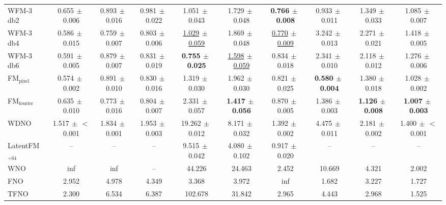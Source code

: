 \begin{table}[ht]
{\begin{tabular}{l ccc ccc ccc}
WFM-3 db2 & 0.655{\scriptsize$\,\pm\,$0.006} & 0.893{\scriptsize$\,\pm\,$0.016} & 0.981{\scriptsize$\,\pm\,$0.022} & 1.051{\scriptsize$\,\pm\,$0.043} & 1.729{\scriptsize$\,\pm\,$0.048} & \textbf{0.766{\scriptsize$\,\pm\,$0.008}} & 0.933{\scriptsize$\,\pm\,$0.011} & 1.349{\scriptsize$\,\pm\,$0.033} & 1.085{\scriptsize$\,\pm\,$0.007} \\
WFM-3 db4 & 0.586{\scriptsize$\,\pm\,$0.015} & 0.759{\scriptsize$\,\pm\,$0.007} & 0.803{\scriptsize$\,\pm\,$0.006} & \underline{1.029{\scriptsize$\,\pm\,$0.059}} & 1.869{\scriptsize$\,\pm\,$0.048} & \underline{0.770{\scriptsize$\,\pm\,$0.009}} & 3.242{\scriptsize$\,\pm\,$0.013} & 2.271{\scriptsize$\,\pm\,$0.021} & 1.418{\scriptsize$\,\pm\,$0.005} \\
WFM-3 db6 & 0.591{\scriptsize$\,\pm\,$0.005} & 0.879{\scriptsize$\,\pm\,$0.007} & 0.831{\scriptsize$\,\pm\,$0.019} & \textbf{0.755{\scriptsize$\,\pm\,$0.025}} & \underline{1.598{\scriptsize$\,\pm\,$0.059}} & 0.834{\scriptsize$\,\pm\,$0.018} & 2.341{\scriptsize$\,\pm\,$0.010} & 2.118{\scriptsize$\,\pm\,$0.012} & 1.276{\scriptsize$\,\pm\,$0.006} \\
\midrule
FM$_\text{pixel}$ & 0.574{\scriptsize$\,\pm\,$0.002} & 0.891{\scriptsize$\,\pm\,$0.010} & 0.830{\scriptsize$\,\pm\,$0.016} & 1.319{\scriptsize$\,\pm\,$0.030} & 1.962{\scriptsize$\,\pm\,$0.030} & 0.821{\scriptsize$\,\pm\,$0.025} & \textbf{0.580{\scriptsize$\,\pm\,$0.004}} & 1.380{\scriptsize$\,\pm\,$0.018} & 1.028{\scriptsize$\,\pm\,$0.002} \\
FM$_\text{fourier}$ & 0.635{\scriptsize$\,\pm\,$0.010} & 0.773{\scriptsize$\,\pm\,$0.016} & 0.804{\scriptsize$\,\pm\,$0.007} & 2.331{\scriptsize$\,\pm\,$0.057} & \textbf{1.417{\scriptsize$\,\pm\,$0.056}} & 0.870{\scriptsize$\,\pm\,$0.005} & 1.386{\scriptsize$\,\pm\,$0.003} & \textbf{1.126{\scriptsize$\,\pm\,$0.008}} & \textbf{1.007{\scriptsize$\,\pm\,$0.003}} \\
WDNO & 1.517{\scriptsize$\,\pm\,$$<$0.001} & 1.834{\scriptsize$\,\pm\,$0.001} & 1.953{\scriptsize$\,\pm\,$0.003} & 19.262{\scriptsize$\,\pm\,$0.012} & 8.171{\scriptsize$\,\pm\,$0.032} & 1.392{\scriptsize$\,\pm\,$0.002} & 4.475{\scriptsize$\,\pm\,$0.011} & 2.181{\scriptsize$\,\pm\,$0.002} & 1.400{\scriptsize$\,\pm\,$$<$0.001} \\
LatentFM$_{\div 64}$ & -- & -- & -- & 9.515{\scriptsize$\,\pm\,$0.042} & 4.080{\scriptsize$\,\pm\,$0.102} & 0.917{\scriptsize$\,\pm\,$0.020} & -- & -- & -- \\
\midrule
WNO & inf & inf & -- & 44.226 & 24.463 & 2.452 & 10.669 & 4.321 & 2.002 \\
FNO & 2.952 & 4.978 & 4.349 & 3.368 & 3.972 & inf & 1.682 & 3.227 & 1.727 \\
TFNO & 2.300 & 6.534 & 6.387 & 102.678 & 31.842 & 2.965 & 4.443 & 2.968 & 1.525 \\
\bottomrule
\end{tabular}
}
\end{table}
